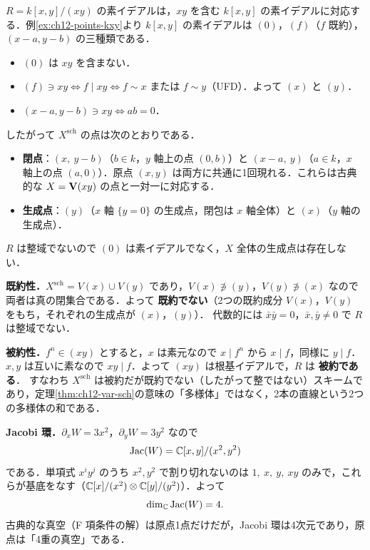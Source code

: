 $R=k[x,y]/(xy)$ の素イデアルは，$xy$ を含む $k[x,y]$ の素イデアルに対応する．例\ref{ex:ch12-points-kxy}より $k[x,y]$ の素イデアルは $(0)$，$(f)$（$f$ 既約），$(x-a,y-b)$ の三種類である．
\begin{itemize}
  \item $(0)$ は $xy$ を含まない．
  \item $(f)\ni xy\iff f\mid xy\iff f\sim x$ または $f\sim y$（UFD）．よって $(x)$ と $(y)$．
  \item $(x-a,y-b)\ni xy\iff ab=0$．
\end{itemize}
したがって $X^{\mathrm{sch}}$ の点は次のとおりである．
\begin{itemize}
  \item \textbf{閉点}：$(x,\ y-b)$（$b\in k$，$y$ 軸上の点 $(0,b)$）と $(x-a,\ y)$（$a\in k$，$x$ 軸上の点 $(a,0)$）．原点 $(x,y)$ は両方に共通に1回現れる．これらは古典的な $X=\mathbf{V}(xy)$ の点と一対一に対応する．
  \item \textbf{生成点}：$(y)$（$x$ 軸 $\{y=0\}$ の生成点，閉包は $x$ 軸全体）と $(x)$（$y$ 軸の生成点）．
\end{itemize}
$R$ は整域でないので $(0)$ は素イデアルでなく，$X$ 全体の生成点は存在しない．

\textbf{既約性．}$X^{\mathrm{sch}}=V(x)\cup V(y)$ であり，$V(x)\not\ni(y)$，$V(y)\not\ni(x)$ なので両者は真の閉集合である．よって \textbf{既約でない}（2つの既約成分 $V(x)$，$V(y)$ をもち，それぞれの生成点が $(x)$，$(y)$）．
代数的には $\bar x\bar y=0$，$\bar x,\bar y\neq0$ で $R$ は整域でない．

\textbf{被約性．}$f^n\in(xy)$ とすると，$x$ は素元なので $x\mid f^n$ から $x\mid f$，同様に $y\mid f$．$x,y$ は互いに素なので $xy\mid f$．よって $(xy)$ は根基イデアルで，$R$ は \textbf{被約である}．
すなわち $X^{\mathrm{sch}}$ は被約だが既約でない（したがって整ではない）スキームであり，定理\ref{thm:ch12-var-sch}の意味の「多様体」ではなく，2本の直線という2つの多様体の和である．

\textbf{Jacobi 環．}$\partial_xW=3x^2$，$\partial_yW=3y^2$ なので
\[
  \mathrm{Jac}(W)=\mathbb{C}[x,y]/(x^2,y^2)
\]
である．単項式 $x^iy^j$ のうち $x^2,y^2$ で割り切れないのは $1,\ x,\ y,\ xy$ のみで，これらが基底をなす（$\mathbb{C}[x]/(x^2)\otimes\mathbb{C}[y]/(y^2)$）．よって
\[
  \dim_{\mathbb{C}}\mathrm{Jac}(W)=4.
\]
古典的な真空（F 項条件の解）は原点1点だけだが，Jacobi 環は4次元であり，原点は「4重の真空」である．

